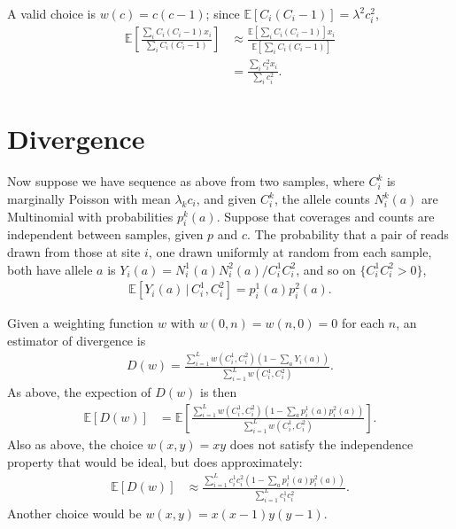 \documentclass{article}
\newcommand{\E}{\mathbb{E}}
\newcommand{\given}{\,\vert\,}
\begin{document}
A valid choice is $w(c)=c(c-1)$; since $\E[C_i(C_i-1)] = \lambda^2 c_i^2$,
\begin{align}
    \E\left[ \frac{ \sum_i C_i(C_i-1) x_i }{ \sum_i C_i(C_i-1) } \right] 
        &\approx \frac{ \E\left[ \sum_i C_i(C_i-1) \right] x_i }{ \E\left[ \sum_i C_i(C_i-1) \right] } \\
        &= \frac{ \sum_i c_i^2 x_i }{ \sum_i c_i^2 } .
\end{align}


\section*{Divergence}

Now suppose we have sequence as above from two samples,
where $C_i^k$ is marginally Poisson with mean $\lambda_k c_i$,
and given $C_i^k$, the allele counts $N_i^k(a)$ are Multinomial
with probabilities $p_i^k(a)$.
Suppose that coverages and counts are independent between samples, given $p$ and $c$.
The probability that a pair of reads drawn from those at site $i$,
one drawn uniformly at random from each sample,
both have allele $a$ is $Y_i(a) = N_i^1(a) N_i^2(a) / C_i^1 C_i^2$,
and so on $\{C_i^1 C_i^2 > 0\}$,
\begin{align}
    \E[ Y_i(a) \given C_i^1, C_i^2 ]  =  p_i^1(a) p_i^2(a) .
\end{align}

Given a weighting function $w$ with $w(0,n)=w(n,0)=0$ for each $n$,
an estimator of divergence is 
\begin{align}
    D(w) = \frac{ \sum_{i=1}^L w(C_i^1,C_i^2) (1-\sum_a Y_i(a)) }{ \sum_{i=1}^L w(C_i^1,C_i^2) }  .
\end{align}
As above, the expection of $D(w)$ is then
\begin{align}
    \E[ D(w) ]  &= \E\left[ \frac{ \sum_{i=1}^L w(C_i^1,C_i^2) (1-\sum_a p_i^1(a) p_i^2(a)) }{ \sum_{i=1}^L w(C_i^1,C_i^2) } \right]  .
\end{align}
Also as above, the choice $w(x,y) = x y$ does not satisfy the independence property that would be ideal,
but does approximately:
\begin{align}
    \E[ D(w) ]  &\approx \frac{ \sum_{i=1}^L c_i^1 c_i^2  (1-\sum_a p_i^1(a) p_i^2(a)) }{ \sum_{i=1}^L c_i^1 c_i^2 } .
\end{align}
Another choice would be $w(x,y) = x(x-1)y(y-1)$.
\end{document}
